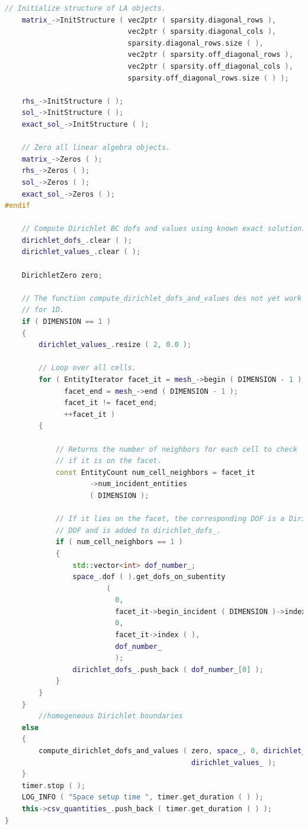 \documentclass[a4paper, 11pt, twoside]{article}
\begin{document}
\begin{lstlisting}[language=C++, basicstyle={\footnotesize, \ttfamily}, keywordstyle=\color{blue}, numbers=none, tabsize=4]
    // Initialize structure of LA objects.
    matrix_->InitStructure ( vec2ptr ( sparsity.diagonal_rows ),
                             vec2ptr ( sparsity.diagonal_cols ),
                             sparsity.diagonal_rows.size ( ),
                             vec2ptr ( sparsity.off_diagonal_rows ),
                             vec2ptr ( sparsity.off_diagonal_cols ),
                             sparsity.off_diagonal_rows.size ( ) );

    rhs_->InitStructure ( );
    sol_->InitStructure ( );
    exact_sol_->InitStructure ( );

    // Zero all linear algebra objects.
    matrix_->Zeros ( );
    rhs_->Zeros ( );
    sol_->Zeros ( );
    exact_sol_->Zeros ( );
#endif

    // Compute Dirichlet BC dofs and values using known exact solution.
    dirichlet_dofs_.clear ( );
    dirichlet_values_.clear ( );

    DirichletZero zero;

    // The function compute_dirichlet_dofs_and_values des not yet work 
    // for 1D.
    if ( DIMENSION == 1 )
    {
        dirichlet_values_.resize ( 2, 0.0 );

        // Loop over all cells.
        for ( EntityIterator facet_it = mesh_->begin ( DIMENSION - 1 ),
              facet_end = mesh_->end ( DIMENSION - 1 );
              facet_it != facet_end;
              ++facet_it )
        {

            // Returns the number of neighbors for each cell to check
            // if it is on the facet.
            const EntityCount num_cell_neighbors = facet_it
                    ->num_incident_entities
                    ( DIMENSION );

            // If it lies on the facet, the corresponding DOF is a Dirichlet
            // DOF and is added to dirichlet_dofs_.
            if ( num_cell_neighbors == 1 )
            {
                std::vector<int> dof_number_;
                space_.dof ( ).get_dofs_on_subentity
                        (
                          0,
                          facet_it->begin_incident ( DIMENSION )->index ( ),
                          0,
                          facet_it->index ( ),
                          dof_number_
                          );
                dirichlet_dofs_.push_back ( dof_number_[0] );
            }
        }
    }
        //homogeneous Dirichlet boundaries
    else
    {
        compute_dirichlet_dofs_and_values ( zero, space_, 0, dirichlet_dofs_,
                                            dirichlet_values_ );
    }
    timer.stop ( );
    LOG_INFO ( "Space setup time ", timer.get_duration ( ) );
    this->csv_quantities_.push_back ( timer.get_duration ( ) );
}
\end{lstlisting}
\end{document}

